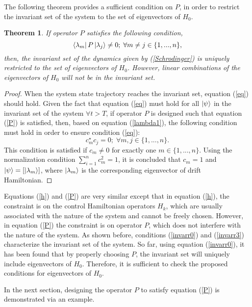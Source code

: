 \documentclass[journal]{IEEEtran}
\newtheorem{theorem}{Theorem}
\theoremstyle{definition}
\begin{document}
The following theorem provides a sufficient condition on $P$, in order to restrict the invariant set of the system to the set of eigenvectors of $H_0$.

\begin{theorem}
If operator $P$ satisfies the following condition,
\begin{equation}\label{P}
     \bra{\lambda_m}P\ket{\lambda_j}\neq 0; \; \forall m\neq j \in \{1,...,n\},
\end{equation}
then, the invariant set of the dynamics given by (\ref{Schrodinger}) is uniquely restricted to the set of eigenvectors of $H_0$. However, linear combinations of the eigenvectors of $H_0$ will not be in the invariant set.
\end{theorem}
\begin{proof}
When the system state trajectory reaches the invariant set, equation (\ref{eq}) should hold. Given the fact that equation (\ref{eq}) must hold for all $\ket{\psi}$ in the invariant set of the system $\forall{t>T}$, if operator $P$ is designed such that equation (\ref{P}) is satisfied, then, based on equation (\ref{lambda1}), the following condition must hold in order to ensure condition (\ref{eq}):  
\begin{equation}\label{c}
 c_m^{\star}c_j=0; \; \forall m,j \in \{1,...,n\}.
 \end{equation}
This condition is satisfied if $c_m\neq0$ for exactly one $m\in \{1,...,n\}$. Using the normalization condition $\displaystyle\sum_{i=1}^{n} c_m^2=1$, it is concluded that $c_m=1$ and $\ket{\psi}=[\ket{\lambda_m}]$, where $\ket{\lambda_m}$ is the corresponding eigenvector of drift Hamiltonian. 
 \end{proof}

Equations (\ref{h}) and (\ref{P}) are very similar except that in equation (\ref{h}), the constraint is on the control Hamiltonian operators $H_k$, which are usually associated with the nature of the system and  cannot be freely chosen. However, in equation (\ref{P}) the constraint is on operator $P$, which does not interfere with the nature of the system. 
 As shown before, conditions (\ref{invarr0}) and (\ref{invarr3}) characterize the invariant set of the system. So far, using equation (\ref{invarr0}), it has been found that by properly choosing $P$, the invariant set will uniquely include eigenvectors of $H_0$. Therefore, it is sufficient to check the proposed conditions for eigenvectors of $H_0$.
 
 In the next section, designing the operator $P$ to satisfy equation (\ref{P}) is demonstrated via an example.
\end{document}
